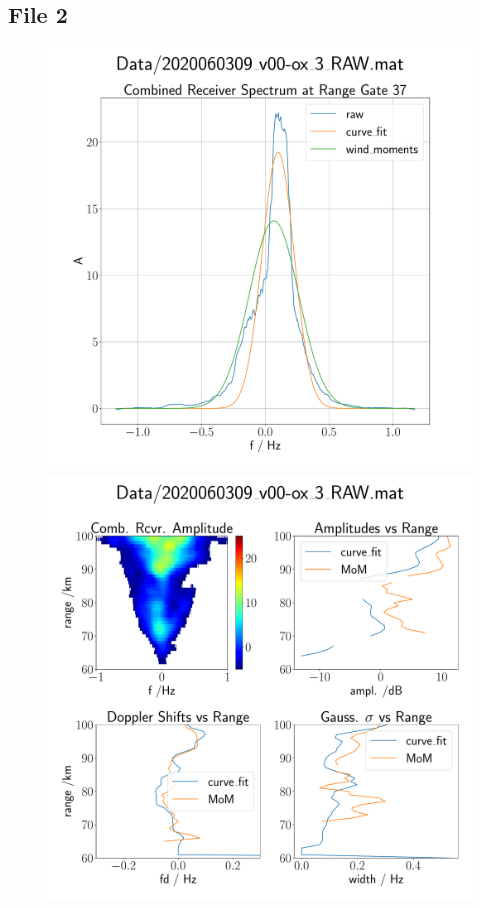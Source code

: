\subsection{File 2}
\begin{figure}[H]
  \begin{minipage}[t]{0.45\textwidth}
    \centering
    \includegraphics[width=\textwidth]{graphics/data_1_single_rg.pdf}
    \caption{}
  \end{minipage}\hfill
  \begin{minipage}[t]{0.45\textwidth}
    \centering
    \includegraphics[width=\textwidth]{graphics/data_1_quad.pdf}
    \caption{}
   \end{minipage}
\end{figure}


